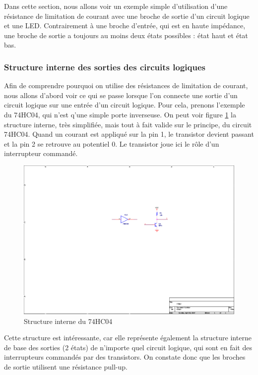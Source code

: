\documentclass[a4paper]{article}
\begin{document}
Dans cette section, nous allons voir un exemple simple d'utilisation d'une résistance de limitation de courant avec une broche de sortie d'un circuit logique et une \ac{LED}. Contrairement à une broche d'entrée, qui est en haute impédance, une broche de sortie a toujours au moins deux états possibles : état haut et état bas.

\subsubsection{Structure interne des sorties des circuits logiques}

Afin de comprendre pourquoi on utilise des résistances de limitation de courant, nous allons d'abord voir ce qui se passe lorsque l'on connecte une sortie d'un circuit logique sur une entrée d'un circuit logique. Pour cela, prenons l'exemple du 74HC04, qui n'est q'une simple porte inverseuse. On peut voir figure \ref{Structure_interne_74HC04} la structure interne, très simplifiée, mais tout à fait valide sur le principe, du circuit 74HC04. Quand un courant est appliqué sur la pin 1, le transistor devient passant et la pin 2 se retrouve au potentiel 0. Le transistor joue ici le rôle d'un interrupteur commandé.

\begin{figure}[H]
	\centering
	\includegraphics[scale=1.00]{Images/Structure_interne_74HC04}
	\caption{Structure interne du 74HC04
		\label{Structure_interne_74HC04}}
\end{figure}

Cette structure est intéressante, car elle représente également la structure interne de base des sorties (2 états) de n'importe quel circuit logique, qui sont en fait des interrupteurs commandés par des transistors. On constate donc que les broches de sortie utilisent une résistance pull-up.
\end{document}
